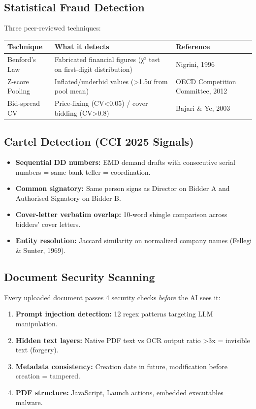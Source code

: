 \documentclass[11pt,a4paper]{article}
\begin{document}
\subsection{Statistical Fraud Detection}

Three peer-reviewed techniques:

\begin{center}
\begin{tabular}{lp{5cm}p{5cm}}
\toprule
\textbf{Technique} & \textbf{What it detects} & \textbf{Reference} \\
\midrule
Benford's Law & Fabricated financial figures (χ² test on first-digit distribution) & Nigrini, 1996 \\
Z-score Pooling & Inflated/underbid values (>1.5σ from pool mean) & OECD Competition Committee, 2012 \\
Bid-spread CV & Price-fixing (CV<0.05) / cover bidding (CV>0.8) & Bajari \& Ye, 2003 \\
\bottomrule
\end{tabular}
\end{center}

\subsection{Cartel Detection (CCI 2025 Signals)}

\begin{itemize}[nosep]
    \item \textbf{Sequential DD numbers:} EMD demand drafts with consecutive serial numbers = same bank teller = coordination.
    \item \textbf{Common signatory:} Same person signs as Director on Bidder A and Authorised Signatory on Bidder B.
    \item \textbf{Cover-letter verbatim overlap:} 10-word shingle comparison across bidders' cover letters.
    \item \textbf{Entity resolution:} Jaccard similarity on normalized company names (Fellegi \& Sunter, 1969).
\end{itemize}

\subsection{Document Security Scanning}

Every uploaded document passes 4 security checks \textit{before} the AI sees it:

\begin{enumerate}[nosep]
    \item \textbf{Prompt injection detection:} 12 regex patterns targeting LLM manipulation.
    \item \textbf{Hidden text layers:} Native PDF text vs OCR output ratio >3x = invisible text (forgery).
    \item \textbf{Metadata consistency:} Creation date in future, modification before creation = tampered.
    \item \textbf{PDF structure:} JavaScript, Launch actions, embedded executables = malware.
\end{enumerate}
\end{document}
